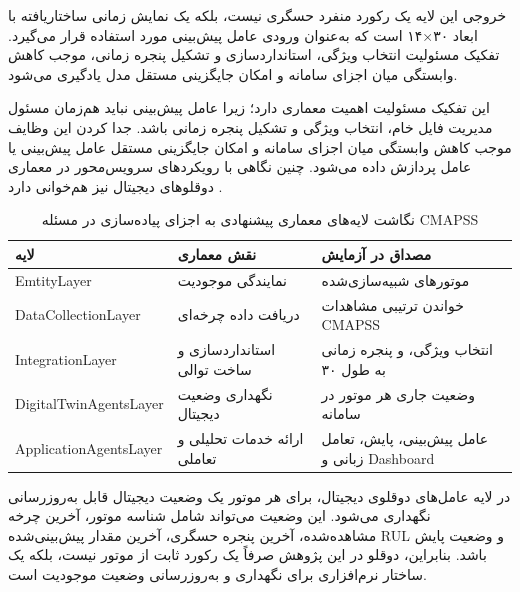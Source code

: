 خروجی این لایه یک رکورد منفرد حسگری نیست، بلکه یک نمایش
زمانی ساختاریافته با ابعاد
۳۰×۱۴
 است که به‌عنوان
ورودی عامل پیش‌بینی مورد استفاده قرار می‌گیرد. تفکیک
مسئولیت انتخاب ویژگی، استانداردسازی و تشکیل پنجره زمانی، موجب کاهش وابستگی میان اجزای سامانه و
امکان جایگزینی مستقل مدل یادگیری می‌شود.


این تفکیک مسئولیت اهمیت معماری دارد؛ زیرا عامل پیش‌بینی نباید
هم‌زمان مسئول مدیریت فایل خام، انتخاب ویژگی و تشکیل پنجره زمانی
باشد. جدا کردن این وظایف موجب کاهش وابستگی میان اجزای سامانه و
امکان جایگزینی مستقل عامل پیش‌بینی یا عامل پردازش داده می‌شود. چنین
نگاهی با رویکردهای سرویس‌محور در معماری دوقلوهای دیجیتال نیز
هم‌خوانی دارد \cite{qi2021enabling,tao2018digital}.

\begin{table}[ht]
	\centering
	\caption{نگاشت لایه‌های معماری پیشنهادی به اجزای پیاده‌سازی در مسئله \gls{CMAPSS}}
	\label{tab:layer-mapping}

	\begin{tabular}{p{3.6cm}p{4.8cm}p{5.2cm}}
		\toprule
		\textbf{لایه} & \textbf{نقش معماری} & \textbf{مصداق در آزمایش} \\
		\midrule
		\gls{EmtityLayer}
		&
		نمایندگی موجودیت
		&
		موتورهای شبیه‌سازی‌شده \lr{FD001}
		\\
		\addlinespace
		\gls{DataCollectionLayer}
		&
		دریافت داده چرخه‌ای
		&
		خواندن ترتیبی مشاهدات \gls{CMAPSS}
		\\
		\addlinespace
		\gls{IntegrationLayer}
		&
		استانداردسازی و ساخت توالی
		&
		انتخاب ویژگی، \lr{StandardScaler} و پنجره زمانی به طول ۳۰
		\\
		\addlinespace
		\gls{DigitalTwinAgentsLayer}
		&
		نگهداری وضعیت دیجیتال
		&
		وضعیت جاری هر موتور در سامانه
		\\
		\addlinespace
		\gls{ApplicationAgentsLayer}
		&
		ارائه خدمات تحلیلی و تعاملی
		&
		عامل پیش‌بینی، پایش، تعامل زبانی و \gls{Dashboard}
		\\
		\bottomrule

	\end{tabular}

\end{table}

در لایه عامل‌های دوقلوی دیجیتال، برای هر موتور یک وضعیت دیجیتال
قابل به‌روزرسانی نگهداری می‌شود. این وضعیت می‌تواند شامل شناسه
موتور، آخرین چرخه مشاهده‌شده، آخرین پنجره حسگری، آخرین مقدار
پیش‌بینی‌شده \gls{RUL} و وضعیت پایش باشد. بنابراین، دوقلو در این
پژوهش صرفاً یک رکورد ثابت از موتور نیست، بلکه یک ساختار نرم‌افزاری
برای نگهداری و به‌روزرسانی وضعیت موجودیت است.

